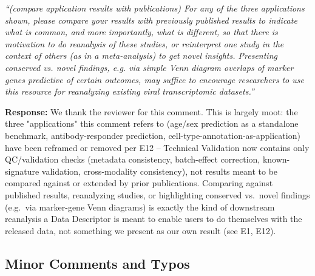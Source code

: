\documentclass[11pt]{article}
\newcommand{\origcomment}[1]{\textit{``#1''}}
\newcommand{\filledresponse}[1]{%
  \par\medskip\noindent\textbf{Response:} #1\par
  \vspace{0.4cm}%
  \par\noindent\hrulefill\par\bigskip
}
\begin{document}
\begin{commentlist}
\item[R2-6.] \origcomment{(compare application results with publications) For any of the three
applications shown, please compare your results with previously published results to indicate
what is common, and more importantly, what is different, so that there is motivation to do
reanalysis of these studies, or reinterpret one study in the context of others (as in a
meta-analysis) to get novel insights. Presenting conserved vs. novel findings, e.g. via simple
Venn diagram overlaps of marker genes predictive of certain outcomes, may suffice to encourage
researchers to use this resource for reanalyzing existing viral transcriptomic datasets.}
\filledresponse{We thank the reviewer for this comment. This is largely moot: the three
"applications" this comment refers to (age/sex prediction as a standalone benchmark,
antibody-responder prediction, cell-type-annotation-as-application) have been reframed or removed
per E12 -- Technical Validation now contains only QC/validation checks (metadata consistency,
batch-effect correction, known-signature validation, cross-modality consistency), not results meant
to be compared against or extended by prior publications. Comparing against published results,
reanalyzing studies, or highlighting conserved vs.\ novel findings (e.g.\ via marker-gene Venn
diagrams) is exactly the kind of downstream reanalysis a Data Descriptor is meant to enable users
to do themselves with the released data, not something we present as our own result (see E1, E12).}

\end{commentlist}

\subsection*{Minor Comments and Typos}
\end{document}
